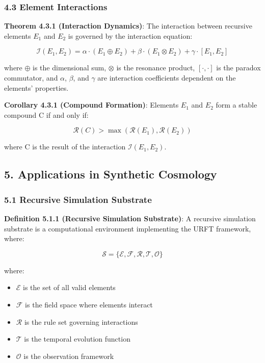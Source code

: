 \documentclass[
]{article}
\providecommand{\tightlist}{%
  \setlength{\itemsep}{0pt}\setlength{\parskip}{0pt}}
\begin{document}
\subsubsection{4.3 Element Interactions}\label{element-interactions}

\textbf{Theorem 4.3.1 (Interaction Dynamics)}: The interaction between
recursive elements \(E_{1}\) and \(E_{2}\) is governed by the
interaction equation:

\[\mathcal{I}(E_1, E_2) = \alpha \cdot (E_1 \oplus E_2) + \beta \cdot (E_1 \otimes E_2) + \gamma \cdot [E_1, E_2]\]

where \(\oplus\) is the dimensional sum, \(\otimes\) is the resonance
product, \([\cdot,\cdot]\) is the paradox commutator, and \(\alpha\),
\(\beta\), and \(\gamma\) are interaction coefficients dependent on the
elements' properties.

\textbf{Corollary 4.3.1 (Compound Formation)}: Elements \(E_{1}\) and
\(E_{2}\) form a stable compound C if and only if:

\[\mathcal{R}(C) > \max(\mathcal{R}(E_1), \mathcal{R}(E_2))\]

where C is the result of the interaction \(\mathcal{I}(E_1, E_2)\).

\subsection{5. Applications in Synthetic
Cosmology}\label{applications-in-synthetic-cosmology}

\subsubsection{5.1 Recursive Simulation
Substrate}\label{recursive-simulation-substrate}

\textbf{Definition 5.1.1 (Recursive Simulation Substrate)}: A recursive
simulation substrate is a computational environment implementing the
URFT framework, where:

\[\mathcal{S} = \{\mathcal{E}, \mathcal{F}, \mathcal{R}, \mathcal{T}, \mathcal{O}\}\]

where:

\begin{itemize}
\tightlist
\item
  \(\mathcal{E}\) is the set of all valid elements
\item
  \(\mathcal{F}\) is the field space where elements interact
\item
  \(\mathcal{R}\) is the rule set governing interactions
\item
  \(\mathcal{T}\) is the temporal evolution function
\item
  \(\mathcal{O}\) is the observation framework
\end{itemize}
\end{document}

